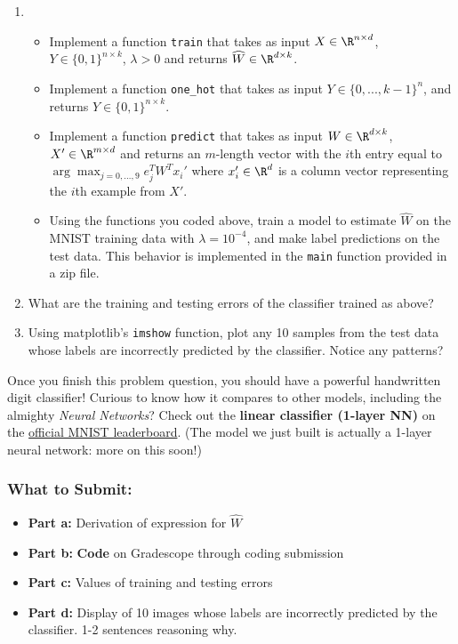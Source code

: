 \documentclass{article}
\begin{document}
\begin{aprob}
\begin{enumerate}
        \bigskip
        
        \item {} 
        \begin{itemize}
            \item Implement a function \verb|train| that takes as input $X \in\R^{n \times d}$, $Y \in \{0,1\}^{n \times k}$, $\lambda > 0$ and returns $\widehat{W} \in \R^{d \times k}$.
            \item Implement a function \verb|one_hot| that takes as input $Y \in \{0, ..., k-1\}^{n}$, and returns $Y \in \{0,1\}^{n \times k}$.
            \item Implement a function  \verb|predict| that takes as input $W \in \R^{d \times k}$, $X' \in\R^{m \times d}$ and returns an $m$-length vector with the $i$th entry equal to $\arg\max_{j=0,\dots,9} e_j^T W^T x_i'$ where $x_i' \in \R^d$ is a column vector representing the $i$th example from $X'$.
            \item Using the functions you coded above, train a model to estimate $\widehat{W}$ on the MNIST training data with $\lambda = 10^{-4}$, and make label predictions on the test data. This behavior is implemented in the \verb|main| function provided in a zip file.
        \end{itemize}
        
         \item {} What are the training and testing errors of the classifier trained as above?

        \item {} Using matplotlib's \texttt{imshow} function, plot any 10 samples from the test data whose labels are incorrectly predicted by the classifier. Notice any patterns?
    \end{enumerate}
    Once you finish this problem question, you should have a powerful handwritten digit classifier! Curious to know how it compares to other models, including the almighty \textit{Neural Networks}? Check out the \textbf{linear classifier (1-layer NN)} on the {\color{blue}\href{http://yann.lecun.com/exdb/mnist/}{official MNIST leaderboard}}. (The model we just built is actually a 1-layer neural network: more on this soon!)
    \subsubsection*{What to Submit:}
    \begin{itemize}
        \item \textbf{Part a:} Derivation of expression for $\widehat{W}$
        \item \textbf{Part b:} \textbf{Code} on Gradescope through coding submission
        \item \textbf{Part c:} Values of training and testing errors
        \item \textbf{Part d:} Display of 10 images whose labels are incorrectly predicted by the classifier. 1-2 sentences reasoning why.
    \end{itemize}
\end{aprob}
\end{document}
